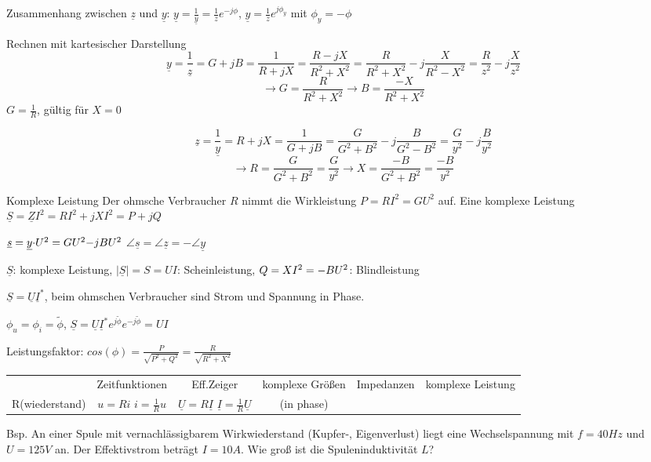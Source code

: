\documentclass[german]{article}
\begin{document}
Zusammenhang zwischen $\underline{z}$ und $\underline{y}$: $\underline{y} = \frac1{\underline{y}} = \frac1z e^{-j\phi}$, $\underline{y} = \frac1z e^{j\phi_y}$ mit $\phi_y = -\phi$

Rechnen mit kartesischer Darstellung
\[ \underline{y} = \frac1{\underline{z}} = G + jB = \frac1{R + jX} = \frac{R - jX}{R^2 + X^2} = \frac{R}{R^2 + X^2} - j\frac{X}{R^2 - X^2} = \frac{R}{z^2} - j \frac{X}{z^2}\]
\[ \rightarrow G = \frac{R}{R^2 + X^2} \rightarrow B = \frac{-X}{R^2 + X^2} \]
$G = \frac1R$, gültig für $X = 0$

\[ \underline{z} = \frac1{\underline{y}} = R + jX = \frac1{G + jB} = \frac{G}{G^2 + B^2} - j\frac{B}{G^2 - B^2} = \frac{G}{y^2} - j \frac{B}{y^2}\]
\[ \rightarrow R = \frac{G}{G^2 + B^2} = \frac{G}{y^2} \rightarrow X = \frac{-B}{G^2 + B^2} = \frac{-B}{y^2} \]

Komplexe Leistung
Der ohmsche Verbraucher $R$ nimmt die Wirkleistung $P = RI^2 = GU^2$ auf. Eine komplexe Leistung $\underline{S} = \underline{Z}I^2 = RI^2 + jXI^2 = P + jQ$

$\underline{s} = \underline{y} {\it \cdot} U^2 = GU^2 {\it -} jBU^2$ \hspace{10pt} $\angle \underline{s} = \angle \underline{z} = - \angle \underline{y}$

$\underline{S}$: komplexe Leistung, $|\underline{S}| = S = UI$: Scheinleistung, $Q = XI^2 = {\it -} BU^2$: Blindleistung

$\underline{S} = \underline{U} \underline{I}^*$, beim ohmschen Verbraucher sind Strom und Spannung in Phase.

$\phi_u = \phi_i = \tilde\phi$, $\underline{S} = \underline{U} \underline{I}^* e^{j\tilde\phi} e^{-j\tilde\phi} = UI$


Leistungsfaktor: $cos(\phi) = \frac{P}{\sqrt{P^2 + Q^2}} = \frac{R}{\sqrt{R^2 + X^2}}$

\begin{tabular}{cccccc}
	 & Zeitfunktionen & Eff.Zeiger & komplexe Größen & Impedanzen & komplexe Leistung \\
	R(wiederstand) & $u = Ri$ $i = \frac1R u$ & $\underline{U} = R\underline{I}$ $\underline{I} = \frac1R \underline{U}$ & (in phase) & 
\end{tabular}

Bsp. An einer Spule mit vernachlässigbarem Wirkwiederstand (Kupfer-, Eigenverlust) liegt eine Wechselspannung mit $f = 40Hz$ und $U = 125V$ an. Der Effektivstrom beträgt $I = 10A$. Wie groß ist die Spuleninduktivität $L$?
\end{document}

